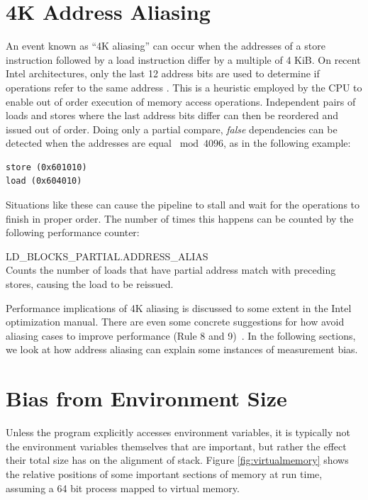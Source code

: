 \documentclass[a4paper,10pt,twocolumn,twoside]{article}
\begin{document}
\section{4K Address Aliasing}
An event known as “4K aliasing” can occur when the addresses of a store instruction followed by a load instruction differ by a multiple of 4 KiB.
On recent Intel architectures, only the last 12 address bits are used to determine if operations refer to the same address \cite{Intel:2012:OptimizationManual}.
This is a heuristic employed by the CPU to enable out of order execution of memory access operations.
Independent pairs of loads and stores where the last address bits differ can then be reordered and issued out of order.
Doing only a partial compare, \emph{false} dependencies can be detected when the addresses are equal $\bmod 4096$, as in the following example: 
\begin{lstlisting}
store (0x601010)
load (0x604010)
\end{lstlisting}
Situations like these can cause the pipeline to stall and wait for the operations to finish in proper order.
The number of times this happens can be counted by the following performance counter:
\begin{description}
  \item{LD\_BLOCKS\_PARTIAL.ADDRESS\_ALIAS} \hfill \\
  Counts the number of loads that have partial address match with preceding stores, causing the load to be reissued.
\end{description}
Performance implications of 4K aliasing is discussed to some extent in the Intel optimization manual. 
There are even some concrete suggestions for how avoid aliasing cases to improve performance (Rule 8 and 9)~\cite{Intel:2012:OptimizationManual}.
In the following sections, we look at how address aliasing can explain some instances of measurement bias.


\section{Bias from Environment Size}
Unless the program explicitly accesses environment variables, it is typically not the environment variables themselves that are important, but rather the effect their total size has on the alignment of stack. 
Figure \ref{fig:virtualmemory} shows the relative positions of some important sections of memory at run time, assuming a 64 bit process mapped to virtual memory. 
\end{document}
